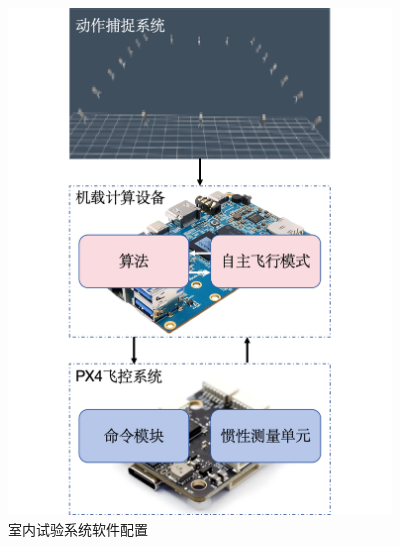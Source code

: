 \documentclass[lang=chs, degree=master, blindreview=true, winfonts=true]{yanputhesis}
\begin{document}
\begin{figure}[hbt!]
	\centering
	\hspace{-1.1cm}
	\includegraphics[width=24pc]{picture/5_10.png} 
	\caption{室内试验系统软件配置} 
	\label{framewor}
\end{figure}




\end{document}
